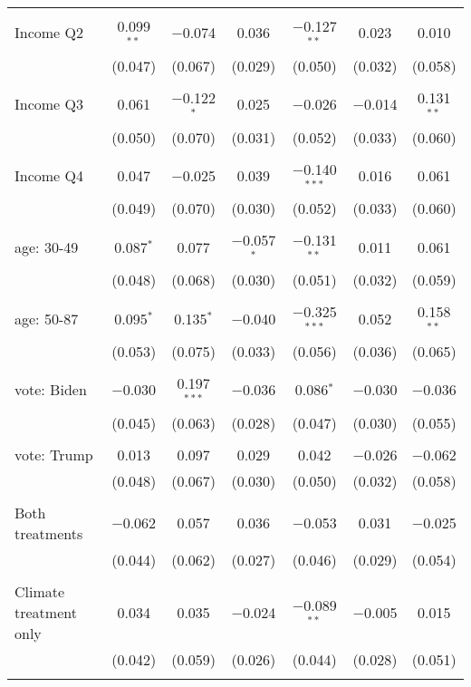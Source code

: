 \begin{tabular}{@{\extracolsep{5pt}}lcccccc}
  & & & & & & \\ 
 Income Q2 & 0.099$^{**}$ & $-$0.074 & 0.036 & $-$0.127$^{**}$ & 0.023 & 0.010 \\ 
  & (0.047) & (0.067) & (0.029) & (0.050) & (0.032) & (0.058) \\ 
  & & & & & & \\ 
 Income Q3 & 0.061 & $-$0.122$^{*}$ & 0.025 & $-$0.026 & $-$0.014 & 0.131$^{**}$ \\ 
  & (0.050) & (0.070) & (0.031) & (0.052) & (0.033) & (0.060) \\ 
  & & & & & & \\ 
 Income Q4 & 0.047 & $-$0.025 & 0.039 & $-$0.140$^{***}$ & 0.016 & 0.061 \\ 
  & (0.049) & (0.070) & (0.030) & (0.052) & (0.033) & (0.060) \\ 
  & & & & & & \\ 
 age: 30-49 & 0.087$^{*}$ & 0.077 & $-$0.057$^{*}$ & $-$0.131$^{**}$ & 0.011 & 0.061 \\ 
  & (0.048) & (0.068) & (0.030) & (0.051) & (0.032) & (0.059) \\ 
  & & & & & & \\ 
 age: 50-87 & 0.095$^{*}$ & 0.135$^{*}$ & $-$0.040 & $-$0.325$^{***}$ & 0.052 & 0.158$^{**}$ \\ 
  & (0.053) & (0.075) & (0.033) & (0.056) & (0.036) & (0.065) \\ 
  & & & & & & \\ 
 vote: Biden & $-$0.030 & 0.197$^{***}$ & $-$0.036 & 0.086$^{*}$ & $-$0.030 & $-$0.036 \\ 
  & (0.045) & (0.063) & (0.028) & (0.047) & (0.030) & (0.055) \\ 
  & & & & & & \\ 
 vote: Trump & 0.013 & 0.097 & 0.029 & 0.042 & $-$0.026 & $-$0.062 \\ 
  & (0.048) & (0.067) & (0.030) & (0.050) & (0.032) & (0.058) \\ 
  & & & & & & \\ 
 Both treatments & $-$0.062 & 0.057 & 0.036 & $-$0.053 & 0.031 & $-$0.025 \\ 
  & (0.044) & (0.062) & (0.027) & (0.046) & (0.029) & (0.054) \\ 
  & & & & & & \\ 
 Climate treatment only & 0.034 & 0.035 & $-$0.024 & $-$0.089$^{**}$ & $-$0.005 & 0.015 \\ 
  & (0.042) & (0.059) & (0.026) & (0.044) & (0.028) & (0.051) \\ 
  & & & & & & \\ 

\end{tabular}
